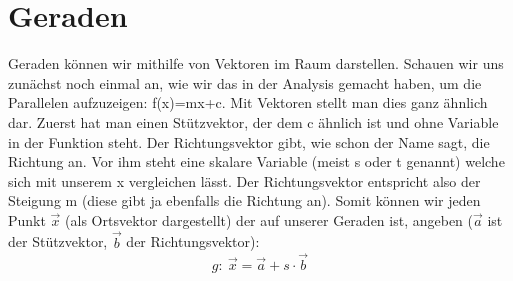 \section{Geraden}
	Geraden können wir mithilfe von Vektoren im Raum darstellen. Schauen wir uns
	zunächst noch einmal an, wie wir das in der Analysis gemacht haben, um die
	Parallelen aufzuzeigen: f(x)=mx+c. Mit Vektoren stellt man dies ganz ähnlich
	dar. Zuerst hat man einen Stützvektor, der dem c ähnlich ist und ohne Variable
	in der Funktion steht. Der Richtungsvektor gibt, wie schon der Name sagt, die
	Richtung an. Vor ihm steht eine skalare Variable (meist s oder t genannt)
	welche sich mit unserem x vergleichen lässt. Der Richtungsvektor entspricht
	also der Steigung m (diese gibt ja ebenfalls die Richtung an). Somit können wir
	jeden Punkt \(\vec{x}\) (als Ortsvektor dargestellt) der auf unserer Geraden
	ist, angeben (\(\vec{a}\) ist der Stützvektor, \(\vec{b}\) der
	Richtungsvektor):
	\[g:\ \vec{x}=\vec{a}+s\cdot \vec{b}\]
 